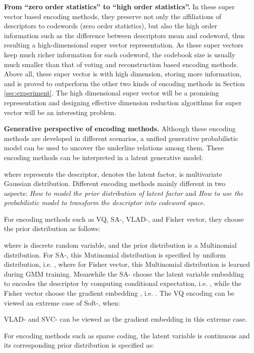 \documentclass[twocolumn]{svjour3}          \smartqed  \usepackage{slashbox}
\begin{document}
\textbf{From ``zero order statistics'' to ``high order statistics''.}  In these super vector based encoding methods, they preserve not only the affiliations of descriptors to codewords (zero order statistics), but also the high order information such as the difference between descriptors mean and codeword, thus resulting a high-dimensional super vector representation. As these super vectors keep much richer information for each codeword, the codebook size is usually much smaller than that of voting and reconstruction based encoding methods. Above all, these super vector is with high dimension, storing more information, and is proved to outperform the other two kinds of encoding methods in Section \ref{sec:experiment}. The high dimensional super vector will be a promising representation and designing effective dimension reduction algorithms for super vector will be an interesting problem.

\textbf{Generative perspective of encoding methods.} Although these encoding methods are developed in different scenarios, a unified generative probabilistic model can be used to uncover the underline relations among them. These encoding methods can be interpreted in a latent generative model:

where  represents the descriptor,  denotes the latent factor,  is multivariate Gaussian distribution. Different encoding methods mainly different in two aspects: \emph{How to model the prior distribution  of latent factor } and \emph{How to use the probabilistic model to transform the descriptor into codeword space.}

For encoding methods such as VQ, SA-, VLAD-, and Fisher vector, they choose the prior distribution  as follows:

where  is discrete random variable, and the prior distribution is a Multinomial distribution. For SA-, this Mutinomial distribution is specified by uniform distribution, i.e. , where for Fisher vector, this Multinomial distribution is learned during GMM training. Meanwhile the SA- choose the latent variable embedding to encodes the descriptor by computing conditional expectation, i.e. , while the Fisher vector choose the gradient embedding \cite{JaakkolaH98}, i.e.  . The VQ encoding can be viewed an extreme case of Soft-, when:

VLAD- and SVC- can be viewed as the gradient embedding in this extreme case.

For encoding methods such as sparse coding, the latent variable  is continuous and its corresponding prior distribution is specified as:
\end{document}
